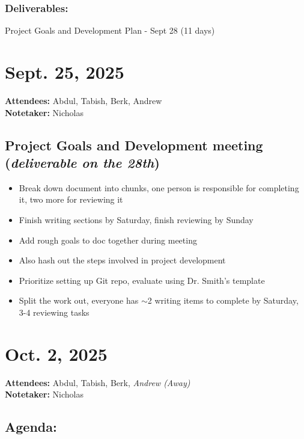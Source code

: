 \documentclass{article}
\begin{document}
			\subsubsection*{Deliverables:}
				Project Goals and Development Plan - Sept 28 (11 days)



	\pagebreak
	\section*{Sept. 25, 2025}

	\textbf{Attendees:} Abdul, Tabish, Berk, Andrew \\
	\textbf{Notetaker:} Nicholas

	\subsection*{Project Goals and Development meeting (\textit{deliverable on the 28th})}
		\begin{itemize}
			\item Break down document into chunks, one person is responsible for completing it, two more for reviewing it
			\item Finish writing sections by Saturday, finish reviewing by Sunday
			\item Add rough goals to doc together during meeting
			\item Also hash out the steps involved in project development
			\item Prioritize setting up Git repo, evaluate using Dr. Smith’s template
			\item Split the work out, everyone has $\sim$2 writing items to complete by Saturday, 3-4 reviewing tasks
		\end{itemize}


	\pagebreak
	\section*{Oct. 2, 2025}

	\textbf{Attendees:} Abdul, Tabish, Berk, \textit{Andrew (Away)} \\
	\textbf{Notetaker:} Nicholas

		\subsection*{Agenda:}
\end{document}
